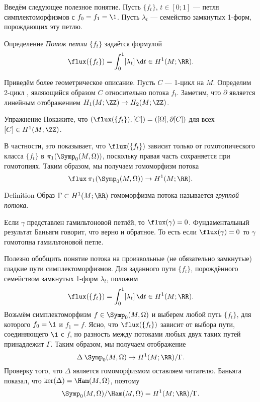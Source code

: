 Введём следующее полезное понятие.
Пусть $\{f_t\}$, $t\in[0;1]$ — петля симплектоморфизмов с $f_0 = f_1 = \1$.
Пусть ${\lambda_t}$ — семейство замкнутых 1-форм, порождающих эту петлю.

\begin{ex*}{Определение}
\emph{Поток петли} $\{f_t\}$ задаётся формулой
\index[symb]{$\flux$} 
\[\flux(\{f_t\}) = \int_0^1 [\lambda_t]\,\d t \in H^1(M;\RR).\]
\end{ex*}

Приведём более геометрическое описание.
Пусть $C$ — 1-цикл на $M$.
Определим 2-цикл , являющийся образом $C$ относительно потока $f_t$. 
Заметим, что $\partial$ является линейным отображением $H_1(M;\ZZ)\to H_2(M;\ZZ)$.

\begin{ex*}{Упражнение}
Покажите, что $(\flux(\{f_t\}), [C]) = ([\Omega], \partial[C])$ для
всех $[C]\in H^1(M;\ZZ)$.
\end{ex*}

В частности, это показывает, что $\flux(\{f_t\})$ зависит только от гомотопического класса $\{f_t\}$ в $\pi_1 (\Symp_0(M,\Omega))$, поскольку правая часть сохраняется при гомотопиях.
Таким образом, мы получаем гомоморфизм потока
\[\flux\:\pi_1(\Symp_0(M,\Omega))\to H^1(M;\RR).\]

\begin{ex*}{Definition}
Образ $\Gamma \subset H^1(M;\RR)$ гомоморфизма потока называется
\emph{группой потока}. 
\end{ex*}


Если $\gamma$ представлен гамильтоновой петлёй, то $\flux(\gamma) = 0$.
Фундаментальный результат Баньяги \cite{B1} говорит,
что верно и обратное. 
То есть если $\flux(\gamma) = 0$ то $\gamma$ гомотопна гамильтоновой петле.

Полезно обобщить понятие потока на произвольные (не обязательно
замкнутые) гладкие пути симплектоморфизмов. 
Для заданного пути $\{f_t\}$, порождённого семейством замкнутых 1-форм
$\lambda_t$, положим  
\[\flux(\{f_t\})=\int_0^1[\lambda_t]\,\d t\in H^1(M;\RR).\]
Возьмём симплектоморфизм $f \in \Symp_0(M,\Omega)$ и выберем любой
путь $\{f_t\}$, для которого $f_0 = \1$ и $f_1 = f$.
Ясно, что $\flux (\{f_t\})$ зависит от выбора пути, соединяющего $\1$
с $f$, но разность между потоками любых двух таких путей принадлежит
$\Gamma$. 
Таким образом, мы получаем отображение
\[\Delta\:\Symp_0(M,\Omega)\to H^1(M;\RR)/\Gamma.\]
Проверку того, что $\Delta$ является гомоморфизмом оставляем читателю.
Баньяга показал, что $\ker(\Delta) = \Ham(M,\Omega)$, поэтому 
\[\Symp_0(M,\Omega)/\Ham(M,\Omega) = H^1(M;\RR)/\Gamma.\]

